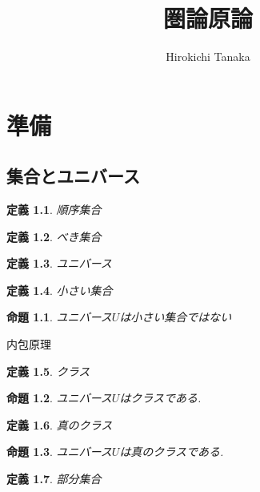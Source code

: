 \documentclass{jsbook}
\title{圏論原論}
\author{Hirokichi Tanaka}
\theoremstyle{plain}
\newtheorem{Def}{定義}[chapter]
\newtheorem{Prop}{命題}[chapter]
\begin{document}
\maketitle

\tableofcontents
\newpage
\chapter{準備}
\section{集合とユニバース}
\begin{Def}
順序集合
\end{Def}
\begin{Def}
べき集合
\end{Def}
\begin{Def}
ユニバース
\end{Def}
\begin{Def}
小さい集合
\end{Def}
\begin{Prop}
ユニバース$U$は小さい集合ではない
\end{Prop}
内包原理

\begin{Def}
クラス
\end{Def}
\begin{Prop}
ユニバース$U$はクラスである.
\end{Prop}
\begin{Def}
真のクラス
\end{Def}
\begin{Prop}
ユニバース$U$は真のクラスである.
\end{Prop}
\begin{Def}
部分集合
\end{Def}
\end{document}
